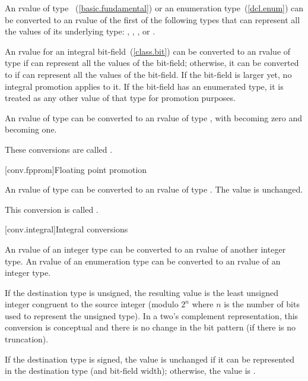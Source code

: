 \pnum
An rvalue of type ~(\ref{basic.fundamental}) or an
enumeration type~(\ref{dcl.enum}) can be converted to an rvalue of
the first of the following types that can represent all the values
of its underlying type: , ,
, or .

\pnum
An rvalue for an integral bit-field~(\ref{class.bit}) can be converted
to an rvalue of type  if  can represent all the
values of the bit-field; otherwise, it can be converted to
 if  can represent all the
values of the bit-field. If the bit-field is larger yet, no integral
promotion applies to it. If the bit-field has an enumerated type, it is
treated as any other value of that type for promotion purposes.

\pnum
{}%
An rvalue of type  can be converted to an rvalue of type
, with  becoming zero and  becoming
one.

\pnum
These conversions are called .

[conv.fpprom]{Floating point promotion}

\pnum
{}%
An rvalue of type  can be converted to an rvalue of type
. The value is unchanged.

\pnum
This conversion is called .

[conv.integral]{Integral conversions}

\pnum
{}%
An rvalue of an integer type can be converted to an rvalue of another
integer type. An rvalue of an enumeration type can be converted to
an rvalue of an integer type.

\pnum
{}%
If the destination type is unsigned, the resulting value is the least
unsigned integer congruent to the source integer (modulo $2^n$ where $n$
is the number of bits used to represent the unsigned type).
\enternote 
In a two's complement representation, this conversion is conceptual and
there is no change in the bit pattern (if there is no truncation).
\exitnote 

\pnum
{}%
If the destination type is signed, the value is unchanged if it can be
represented in the destination type (and bit-field width); otherwise,
the value is .

